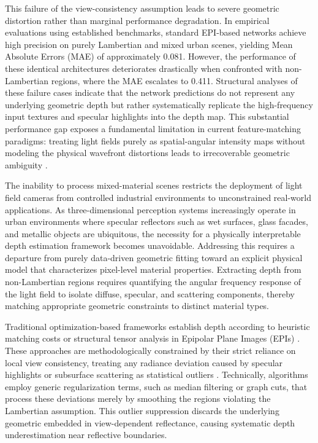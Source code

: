 \documentclass[lettersize,journal]{IEEEtran}
\begin{document}
This failure of the view-consistency assumption leads to severe geometric distortion rather than marginal performance degradation. In empirical evaluations using established benchmarks, standard EPI-based networks achieve high precision on purely Lambertian and mixed urban scenes, yielding Mean Absolute Errors (MAE) of approximately 0.081. However, the performance of these identical architectures deteriorates drastically when confronted with non-Lambertian regions, where the MAE escalates to 0.411. Structural analyses of these failure cases indicate that the network predictions do not represent any underlying geometric depth but rather systematically replicate the high-frequency input textures and specular highlights into the depth map. This substantial performance gap exposes a fundamental limitation in current feature-matching paradigms: treating light fields purely as spatial-angular intensity maps without modeling the physical wavefront distortions leads to irrecoverable geometric ambiguity \cite{wang2023, lyu2022, peng2022}.

The inability to process mixed-material scenes restricts the deployment of light field cameras from controlled industrial environments to unconstrained real-world applications. As three-dimensional perception systems increasingly operate in urban environments where specular reflectors such as wet surfaces, glass facades, and metallic objects are ubiquitous, the necessity for a physically interpretable depth estimation framework becomes unavoidable. Addressing this requires a departure from purely data-driven geometric fitting toward an explicit physical model that characterizes pixel-level material properties. Extracting depth from non-Lambertian regions requires quantifying the angular frequency response of the light field to isolate diffuse, specular, and scattering components, thereby matching appropriate geometric constraints to distinct material types.

Traditional optimization-based frameworks establish depth according to heuristic matching costs or structural tensor analysis in Epipolar Plane Images (EPIs) \cite{wanner2014, tao2013}. These approaches are methodologically constrained by their strict reliance on local view consistency, treating any radiance deviation caused by specular highlights or subsurface scattering as statistical outliers \cite{wang2015}. Technically, algorithms employ generic regularization terms, such as median filtering or graph cuts, that process these deviations merely by smoothing the regions violating the Lambertian assumption. This outlier suppression discards the underlying geometric embedded in view-dependent reflectance, causing systematic depth underestimation near reflective boundaries.
\end{document}
